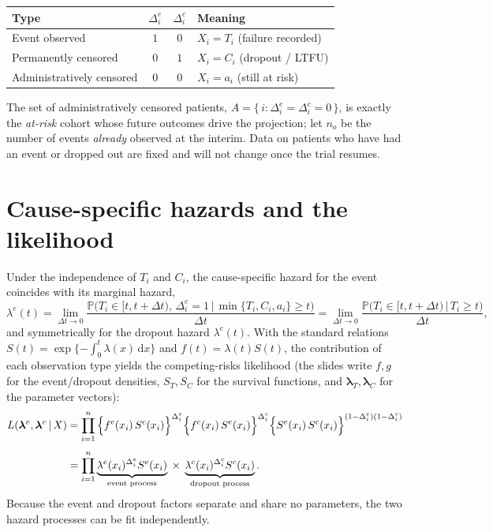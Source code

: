 \documentclass[11pt]{article}
\newcommand{\Prob}{\mathbb{P}}
\newcommand{\given}{\,\vert\,}
\newcommand{\dd}{\,\mathrm{d}}
\begin{document}
\begin{center}
\begin{tabular}{lccl}
\toprule
Type & $\Delta^e_i$ & $\Delta^c_i$ & Meaning \\
\midrule
Event observed        & $1$ & $0$ & $X_i = T_i$ (failure recorded) \\
Permanently censored  & $0$ & $1$ & $X_i = C_i$ (dropout / LTFU) \\
Administratively censored & $0$ & $0$ & $X_i = a_i$ (still at risk) \\
\bottomrule
\end{tabular}
\end{center}

The set of administratively censored patients,
$A = \{\, i : \Delta^e_i = \Delta^c_i = 0 \,\}$, is exactly the
\emph{at-risk} cohort whose future outcomes drive the projection; let $n_o$ be
the number of events \emph{already} observed at the interim. Data on patients
who have had an event or dropped out are fixed and will not change once the
trial resumes.

\section{Cause-specific hazards and the likelihood}

Under the independence of $T_i$ and $C_i$, the cause-specific hazard for the
event coincides with its marginal hazard,
\[
\lambda^{e}(t)
= \lim_{\Delta t \to 0}
\frac{\Prob\!\big(T_i \in [t,t+\Delta t),\,\Delta^e_i = 1 \given \min\{T_i,C_i,a_i\}\ge t\big)}{\Delta t}
= \lim_{\Delta t \to 0}
\frac{\Prob\!\big(T_i \in [t,t+\Delta t) \given T_i \ge t\big)}{\Delta t},
\]
and symmetrically for the dropout hazard $\lambda^{c}(t)$. With the standard
relations $S(t) = \exp\{-\int_0^t \lambda(x)\dd x\}$ and $f(t)=\lambda(t)S(t)$,
the contribution of each observation type yields the competing-risks
likelihood (the slides write $f,g$ for the event/dropout densities,
$S_T,S_C$ for the survival functions, and $\bm\lambda_T,\bm\lambda_C$ for the
parameter vectors):
\begin{align}
L(\bm\lambda^{e},\bm\lambda^{c} \given X)
&= \prod_{i=1}^{n}
\Big\{ f^{e}(x_i)\,S^{c}(x_i) \Big\}^{\Delta^e_i}
\Big\{ f^{c}(x_i)\,S^{e}(x_i) \Big\}^{\Delta^c_i}
\Big\{ S^{e}(x_i)\,S^{c}(x_i) \Big\}^{(1-\Delta^e_i)(1-\Delta^c_i)}
\notag\\[4pt]
&= \prod_{i=1}^{n}
\underbrace{\lambda^{e}(x_i)^{\Delta^e_i} S^{e}(x_i)}_{\text{event process}}
\;\times\;
\underbrace{\lambda^{c}(x_i)^{\Delta^c_i} S^{c}(x_i)}_{\text{dropout process}} .
\label{eq:lik}
\end{align}
Because the event and dropout factors separate and share no parameters, the
two hazard processes can be fit independently.
\end{document}
